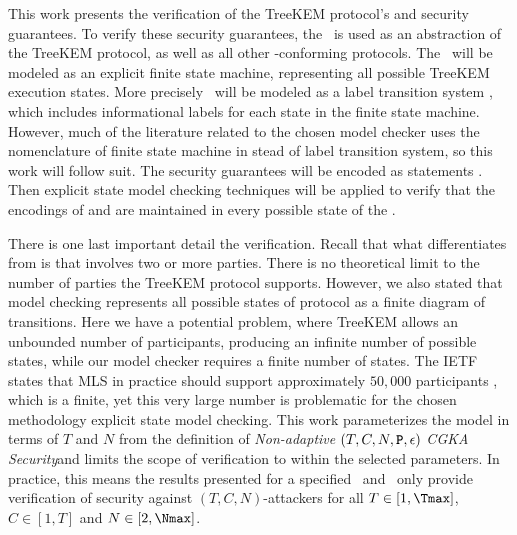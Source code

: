 This work presents the verification of the TreeKEM protocol's  and  security guarantees.
To verify these security guarantees, the \CGKAsec\ is used as an abstraction of the TreeKEM protocol, as well as all other \CGKAdef-conforming protocols.
The \CGKAsec\ will be modeled as an explicit finite state machine, representing all possible TreeKEM execution states.
More precisely \CGKAsec\ will be modeled as a label transition system \autocite{keller1976formal}, which includes informational labels for each state in the finite state machine.
However, much of the literature related to the chosen model checker uses the nomenclature of finite state machine in stead of label transition system, so this work will follow suit.
The security guarantees will be encoded as  statements \autocite{4567924}.
Then explicit state model checking techniques will be applied to verify that the  encodings of  and  are maintained in every possible state of the \CGKAsec.

There is one last important detail the verification.
Recall that what differentiates  from  is that  involves two or more parties.
There is no theoretical limit to the number of parties the TreeKEM protocol supports.
However, we also stated that model checking represents all possible states of protocol as a finite diagram of transitions.
Here we have a potential problem, where TreeKEM allows an unbounded number of participants, producing an infinite number of possible states, while our model checker requires a finite number of states.
The IETF states that MLS in practice should support approximately $50,000$ participants \autocite{Omara2020}, which is a finite, yet this very large number is problematic for the chosen methodology explicit state model checking.
This work parameterizes the model in terms of \(T\) and \(N\) from the definition of \emph{Non-adaptive} \((T, C, N, \textbf{\texttt{P}}, \epsilon)\) \emph{CGKA Security}and limits the scope of verification to within the selected parameters.
In practice, this means the results presented for a specified \Tmax\ and \Nmax\ only provide verification of security against \((T, C, N)\)-attackers for all \(T \in [1, \Tmax]\), \(C \in [1, T]\) and \(N \in [2, \Nmax]\).

